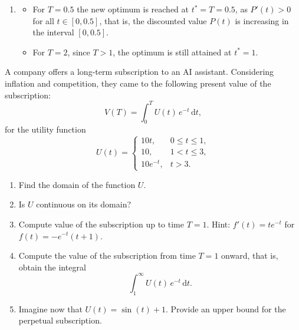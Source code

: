 \documentclass[11pt]{exam}
\begin{document}
\begin{questions}
\begin{solution}[0cm]
\begin{enumerate}[leftmargin = 0.5cm, label = (\alph*), rightmargin = 0.2cm]
    \item 
    \begin{itemize}
        \item For $T = 0.5$ the new optimum is reached at $t^* = T = 0.5$, as $P'(t) > 0$ for all $t \in [0, 0.5]$, that is, the discounted value $P(t)$ is increasing in the interval $[0, 0.5]$.
        \item For $T = 2$, since $T > 1$, the optimum is still attained at $t^* = 1$.
    \end{itemize}

\end{enumerate}
\end{solution}


\question[3]
A company offers a long-term subscription to an AI assistant. Considering inflation and competition, they came to the following present value of the subscription:
\[
    V(T) = \int_{0}^{T} U(t)\, e^{-t}\, \mathrm{d}t,
\]
for the utility function
\[
U(t) =
\begin{cases}
    10t, & 0 \le t \le 1, \\[4pt]
    10,  & 1 < t \le 3, \\[4pt]
    10 e^{-t}, & t > 3.
\end{cases}
\]

\begin{enumerate}[leftmargin = 0.5cm, label = (\alph*), rightmargin = 0.2cm]

    \item Find the domain of the function $U$.

    \item Is $U$ continuous on its domain?

    \item Compute value of the subscription up to time $T = 1$. Hint: $f'(t) = te^{-t}$ for $f(t) =  -e^{-t}(t+1)$.

    \item Compute the value of the subscription from time $T = 1$ onward, that is, obtain the integral
    $$
    \int_{1}^{\infty} U(t)\, e^{-t}\, \mathrm{d}t.
    $$

    \item Imagine now that $U(t) = \sin(t) + 1$. Provide an upper bound for the perpetual subscription.
\end{enumerate}

\begin{solution}[0cm]

\begin{enumerate}[leftmargin = 0.5cm, label = (\alph*), rightmargin = 0.2cm]


\end{enumerate}
\end{solution}
\end{questions}
\end{document}
